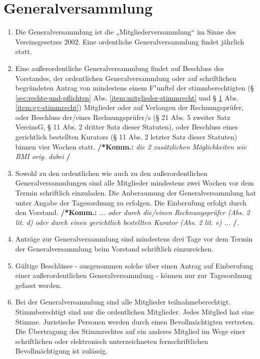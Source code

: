 \documentclass[a4paper,12pt]{article}
\newcommand{\comment}[1]{{\bf /*Komm.:} \textit{#1} {\bf */}}
\begin{document}
\section{Generalversammlung} %
\label{sec:generalversammlung}
\begin{enumerate}
\item Die Generalversammlung ist die „Mitgliederversammlung“ im Sinne des Vereinsgesetzes 2002. Eine ordentliche Generalversammlung findet jährlich statt.
\item Eine außerordentliche Generalversammlung findet auf Beschluss des Vorstandes, der ordentlichen Generalversammlung oder
auf schriftlichen begründeten Antrag von mindestens einem F"unftel der stimmberechtigten (§ \ref{sec:rechte-und-pflichten} Abs. \ref{item:mitglieder-stimmrecht} und § \ref{sec:generalversammlung} Abs. \ref{item:gv-stimmrecht}) Mitglieder
oder auf Verlangen der Rechnungsprüfer, oder 
Beschluss der/eines Rechnungsprüfer/s (§ 21 Abs. 5 zweiter Satz VereinsG, § 11 Abs. 2 dritter Satz dieser Statuten), oder Beschluss eines gerichtlich bestellten Kurators (§ 11 Abs. 2 letzter Satz dieser Statuten)
binnen vier Wochen statt. \comment{die 2 zusätzlichen Möglichkeiten wie BMI orig. dabei}
\item Sowohl zu den ordentlichen wie auch zu den außerordentlichen Generalversammlungen sind alle Mitglieder mindestens zwei Wochen vor dem Termin schriftlich einzuladen. Die Anberaumung der Generalversammlung hat unter Angabe der Tagesordnung zu erfolgen. Die Einberufung erfolgt durch den Vorstand.
\comment{... oder durch die/einen Rechnungsprüfer (Abs. 2 lit. d) oder durch einen gerichtlich bestellten Kurator (Abs. 2 lit. e) ...}.

\item Anträge zur Generalversammlung sind mindestens drei Tage vor dem Termin der Generalversammlung beim Vorstand schriftlich einzureichen.

\item Gültige Beschlüsse - ausgenommen solche über einen Antrag auf Einberufung einer außerordentlichen Generalversammlung - können nur zur Tagesordnung gefasst werden.

\item \label{item:gv-stimmrecht} Bei der Generalversammlung sind alle Mitglieder teilnahmeberechtigt.
Stimmberechtigt sind nur die ordentlichen Mitglieder.
Jedes Mitglied hat eine Stimme.
Juristische Personen werden durch einen Bevollmächtigten vertreten.
Die Übertragung des Stimmrechtes auf ein anderes Mitglied im Wege einer schriftlichen oder elektronisch unterzeichneten fernschriftlichen Bevollmächtigung ist zulässig.


\end{enumerate}
\end{document}
